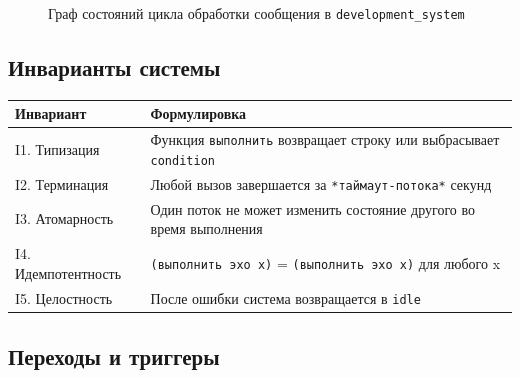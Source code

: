 \documentclass[12pt, a4paper, twoside]{article}
\begin{document}
\begin{figure}[H]
\caption{Граф состояний цикла обработки сообщения в \texttt{development\_system}}
\label{fig:state-graph}
\end{figure}

\subsection{Инварианты системы}

\begin{center}
\begin{tabularx}{\textwidth}{lL}
  \toprule
  \textbf{Инвариант} & \textbf{Формулировка} \\
  \midrule
  I1. Типизация & Функция \texttt{выполнить} возвращает строку или выбрасывает \texttt{condition} \\
  I2. Терминация & Любой вызов завершается за \texttt{*таймаут-потока*} секунд \\
  I3. Атомарность & Один поток не может изменить состояние другого во время выполнения \\
  I4. Идемпотентность & \texttt{(выполнить эхо x)} = \texttt{(выполнить эхо x)} для любого x \\
  I5. Целостность & После ошибки система возвращается в \texttt{idle} \\
  \bottomrule
\end{tabularx}
\end{center}

\subsection{Переходы и триггеры}
\end{document}
